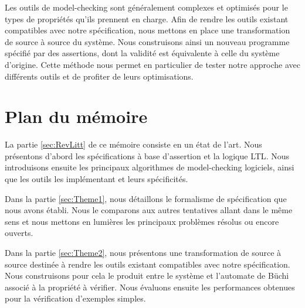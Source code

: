 Les outils de model-checking sont généralement complexes et optimisés
pour le types de propriétés qu'ils prennent en charge. Afin de rendre
les outils existant compatibles avec notre spécification, nous mettons
en place une transformation de source à source du système. Nous
construisons ainsi un nouveau programme spécifié par des assertions,
dont la validité est équivalente à celle du système d'origine. Cette
méthode nous permet en particulier de tester notre approche avec
différents outils et de profiter de leurs optimisations.

\section{Plan du mémoire}  %

La partie \ref{sec:RevLitt} de ce mémoire consiste en un état de l'art. Nous présentons
d'abord les spécifications à base d'assertion et la logique \ac{LTL}. Nous
introduisons ensuite les principaux algorithmes de model-checking
logiciels, ainsi que les outils les implémentant et leurs spécificités.

Dans la partie \ref{sec:Theme1}, nous détaillons le formalisme de spécification que
nous avons établi. Nous le comparons aux autres tentatives allant dans
le même sens et nous mettons en lumières les principaux problèmes
résolus ou encore ouverts.

Dans la partie \ref{sec:Theme2}, nous présentons une transformation de source à source
destinée à rendre les outils existant compatibles avec notre
spécification. Nous construisons pour cela le produit entre le système
et l'automate de Büchi associé à la propriété à vérifier. Nous évaluons
ensuite les performances obtenues pour la vérification d'exemples
simples.
